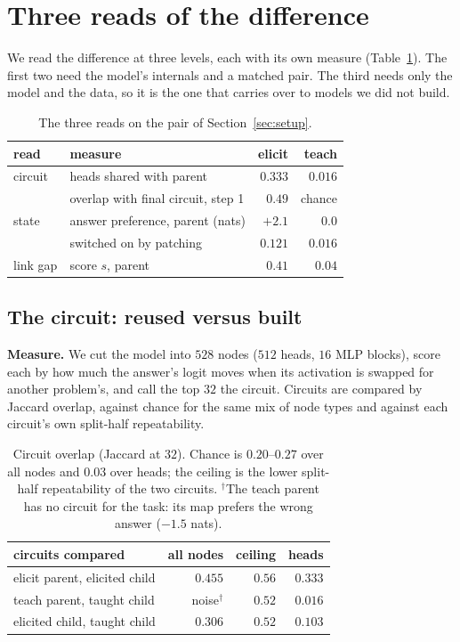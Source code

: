 \documentclass{article}
\theoremstyle{definition}
\begin{document}
\section{Three reads of the difference}
\label{sec:reads}

We read the difference at three levels, each with its own measure (Table~\ref{tab:reads}). The first two need
the model's internals and a matched pair. The third needs only the model and the data, so it is the one that
carries over to models we did not build.

\begin{table}[t]
\centering
\small
\setlength{\tabcolsep}{3.5pt}
\begin{tabular}{llrr}
\toprule
read & measure & elicit & teach \\
\midrule
circuit & heads shared with parent & $0.333$ & $0.016$ \\
 & overlap with final circuit, step 1 & $0.49$ & chance \\
state & answer preference, parent (nats) & $+2.1$ & $0.0$ \\
 & switched on by patching & $0.121$ & $0.016$ \\
link gap & score $s$, parent & $0.41$ & $0.04$ \\
\bottomrule
\end{tabular}
\caption{The three reads on the pair of Section~\ref{sec:setup}.}
\label{tab:reads}
\end{table}

\subsection{The circuit: reused versus built}
\label{sec:circuit}

\textbf{Measure.} We cut the model into $528$ nodes ($512$ heads, $16$ MLP blocks), score each by how much the answer's logit moves
when its activation is swapped for another problem's, and call the top $32$ the circuit. Circuits are compared by
Jaccard overlap, against chance for the same mix of node types and against each circuit's own split-half
repeatability.

\begin{table}[t]
\centering
\small
\setlength{\tabcolsep}{3.5pt}
\begin{tabular}{lrrr}
\toprule
circuits compared & all nodes & ceiling & heads \\
\midrule
elicit parent, elicited child & $0.455$ & $0.56$ & $0.333$ \\
teach parent, taught child & noise$^\dagger$ & $0.52$ & $0.016$ \\
elicited child, taught child & $0.306$ & $0.52$ & $0.103$ \\
\bottomrule
\end{tabular}
\caption{Circuit overlap (Jaccard at $32$). Chance is $0.20$--$0.27$ over all nodes and $0.03$ over heads; the
ceiling is the lower split-half repeatability of the two circuits. $^\dagger$The teach parent has no circuit for
the task: its map prefers the wrong answer ($-1.5$ nats).}
\label{tab:overlap}
\end{table}
\end{document}

